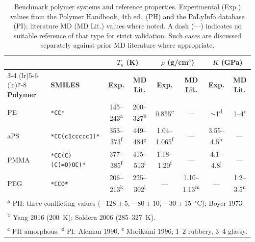 \documentclass[journal=acsami,manuscript=article]{achemso}
\begin{document}
\begin{table}[ht]
\centering
\caption{Benchmark polymer systems and reference properties.
Experimental (Exp.) values from the Polymer Handbook, 4th ed.\ (PH)\cite{brandrup1999polymerhandbook} and the PoLyInfo database (PI);\cite{otsuka2011polyinfo}
literature MD (MD Lit.) values where noted. A dash (---) indicates no suitable reference of that type for strict validation. Such cases are discussed separately against prior MD literature where appropriate.}
\label{tab:benchmarks}
\footnotesize
\begin{tabular}{ll cc cc cc}
\toprule
& & \multicolumn{2}{c}{\textbf{$T_g$ (K)}} & \multicolumn{2}{c}{\textbf{$\rho$ (g/cm$^3$)}} & \multicolumn{2}{c}{\textbf{$K$ (GPa)}} \\
\cmidrule(lr){3-4} \cmidrule(lr){5-6} \cmidrule(lr){7-8}
\textbf{Polymer} & \textbf{SMILES} & \textbf{Exp.} & \textbf{MD Lit.} & \textbf{Exp.} & \textbf{MD Lit.} & \textbf{Exp.} & \textbf{MD Lit.} \\
\midrule
PE   & \texttt{*CC*}              & 145--243\textsuperscript{a} & 200--327\textsuperscript{b} & 0.855\textsuperscript{c} & ---          & $\sim$1\textsuperscript{d} & 1--4\textsuperscript{e} \\
aPS  & \texttt{*CC(c1ccccc1)*}    & 353--373\textsuperscript{f} & 449--484\textsuperscript{g} & 1.04--1.065\textsuperscript{f} & --- & 3.55--4.5\textsuperscript{h} & --- \\
PMMA & \texttt{*CC(C)(C(=O)OC)*}  & 377--385\textsuperscript{f} & 415--513\textsuperscript{i} & 1.18--1.20\textsuperscript{f} & ---  & 4.1--4.8\textsuperscript{j} & --- \\
PEG  & \texttt{*CCO*}             & 206--213\textsuperscript{k} & 225--302\textsuperscript{l} & ---  & 1.10--1.13\textsuperscript{m} & --- & 1.2--3.5\textsuperscript{n} \\
\bottomrule
\multicolumn{8}{l}{\scriptsize \textsuperscript{a} PH: three conflicting values ($-128\pm5$, $-80\pm10$, $-30\pm15$~$^\circ$C); Boyer 1973.\cite{boyer1973pe}} \\
\multicolumn{8}{l}{\scriptsize \textsuperscript{b} Yang 2016\cite{yang2016pe} (200~K); Soldera 2006\cite{soldera2006tg} (285--327~K).} \\
\multicolumn{8}{l}{\scriptsize \textsuperscript{c} PH amorphous.\cite{brandrup1999polymerhandbook} \textsuperscript{d} PI: Aleman 1990. \textsuperscript{e} Morikami 1996;\cite{morikami1996bulkmodulus} 1--2 rubbery, 3--4 glassy.} \\

\end{tabular}
\end{table}
\end{document}
